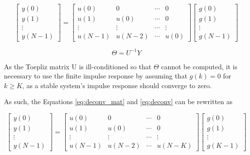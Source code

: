 \documentclass[a4paper,11pt]{article}
\begin{document}
\begin{equation}
\label{eq:deconv_mat}
  \left[ {\begin{array}{c}
   y(0)\\
   y(1)\\
   \vdots \\
   y(N-1)
  \end{array} } \right] 
  = 
  \left[ {\begin{array}{cccc}
   u(0) & 0 & \cdots & 0\\
   u(1) & u(0) & \cdots & 0\\
   \vdots & \vdots & \cdots & \vdots \\
   u(N-1) & u(N-2) & \cdots & u(0)
  \end{array} } \right]
  \left[ {\begin{array}{c}
   g(0)\\
   g(1)\\
   \vdots \\
   g(N-1)
  \end{array} } \right] 
\end{equation}

\begin{equation}
\label{eq:deconv}
\Theta = U^{-1}Y
\end{equation}

As the Toepliz matrix U is ill-conditioned so that $\Theta$ cannot be computed, it is necessary to use the finite impulse response by assuming that $g(k) = 0$ for $k \geq K$, as a stable system's impulse response should converge to zero. 

As such, the Equations \ref{eq:deconv_mat} and \ref{eq:deconv} can be rewritten as   

\begin{equation}
\label{eq:deconv_mat_K}
  \left[ {\begin{array}{c}
   y(0)\\
   y(1)\\
   \vdots \\
   y(N-1)
  \end{array} } \right] 
  = 
  \left[ {\begin{array}{cccc}
   u(0) & 0 & \cdots & 0\\
   u(1) & u(0) & \cdots & 0\\
   \vdots & \vdots & \cdots & \vdots \\
   u(N-1) & u(N-2) & \cdots & u(N-K)
  \end{array} } \right]
  \left[ {\begin{array}{c}
   g(0)\\
   g(1)\\
   \vdots \\
   g(K-1)
  \end{array} } \right] 
\end{equation}
\end{document}
